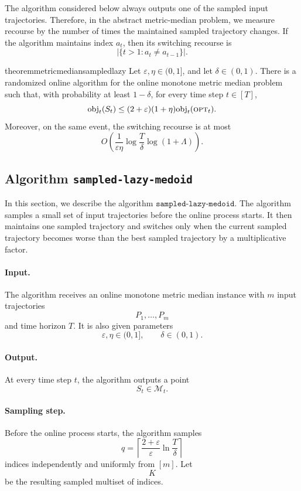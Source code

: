 The algorithm considered below always outputs one of the sampled input
trajectories. Therefore, in the abstract metric-median problem, we measure
recourse by the number of times the maintained sampled trajectory changes. If
the algorithm maintains index \(a_t\), then its switching recourse is
\[
    \left|
    \{t>1:a_t\neq a_{t-1}\}
    \right|.
\]

\begin{restatable}{theorem}{metricmediansampledlazy}
\label{thm:metric-median-sampled-lazy}
Let \(\varepsilon,\eta\in(0,1]\), and let \(\delta\in(0,1)\). There is a randomized online algorithm for the online monotone metric median problem such that, with probability at least \(1-\delta\), for every time step \(t\in[T]\),
\[
    \text{obj}_t(S_t)
    \le
    (2+\varepsilon)(1+\eta)\text{obj}_t(\textsc{opt}_t).
\]
Moreover, on the same event, the switching recourse is at most
\[
    O\left(
        \frac{1}{\varepsilon\eta}
        \log\frac{T}{\delta}
        \log(1+\Lambda)
    \right).
\]
\end{restatable}

\subsection{Algorithm \texttt{sampled-lazy-medoid}}

In this section, we describe the algorithm
\(\texttt{sampled-lazy-medoid}\). The algorithm samples a small set of input
trajectories before the online process starts. It then maintains one sampled
trajectory and switches only when the current sampled trajectory becomes worse
than the best sampled trajectory by a multiplicative factor.

\paragraph{Input.}
The algorithm receives an online monotone metric median instance with \(m\)
input trajectories
\[
    P_1,\ldots,P_m
\]
and time horizon \(T\). It is also given parameters
\[
    \varepsilon,\eta\in(0,1],
    \qquad
    \delta\in(0,1).
\]

\paragraph{Output.}
At every time step \(t\), the algorithm outputs a point
\[
    S_t\in\mathcal M_t.
\]

\paragraph{Sampling step.}
Before the online process starts, the algorithm samples
\[
    q
    =
    \left\lceil
        \frac{2+\varepsilon}{\varepsilon}
        \ln\frac{T}{\delta}
    \right\rceil
\]
indices independently and uniformly from \([m]\). Let
\[
    K
\]
be the resulting sampled multiset of indices.

